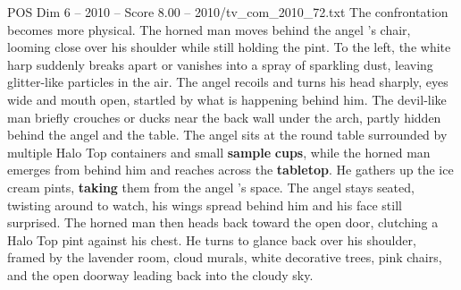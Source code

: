 \begin{textsample}{POS Dim 6 – 2010 – Score 8.00 – 2010/tv\_com\_2010\_72.txt}
The confrontation becomes more physical.
The horned man moves behind the angel ’s chair, looming close over his shoulder while still holding the pint.
To the left, the white harp suddenly breaks apart or vanishes into a spray of sparkling dust, leaving glitter-like particles in the air.
The angel recoils and turns his head sharply, eyes wide and mouth open, startled by what is happening behind him.
The devil-like man briefly crouches or ducks near the back wall under the arch, partly hidden behind the angel and the table.
The angel sits at the round table surrounded by multiple Halo Top containers and small \textbf{sample} \textbf{cups}, while the horned man emerges from behind him and reaches across the \textbf{tabletop}.
He gathers up the ice cream pints, \textbf{taking} them from the angel ’s space.
The angel stays seated, twisting around to watch, his wings spread behind him and his face still surprised.
The horned man then heads back toward the open door, clutching a Halo Top pint against his chest.
He turns to glance back over his shoulder, framed by the lavender room, cloud murals, white decorative trees, pink chairs, and the open doorway leading back into the cloudy sky.

\end{textsample}
